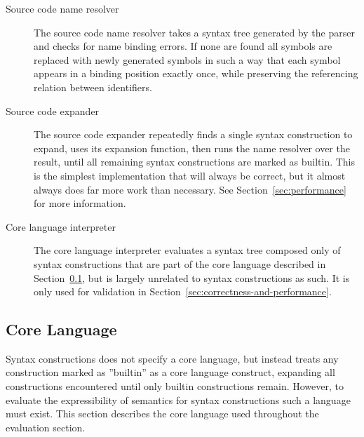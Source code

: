 \documentclass{kththesis}
\begin{document}
\begin{description}
  \item[Source code name resolver] The source code name resolver takes a syntax tree generated by the parser and checks for name binding errors. If none are found all symbols are replaced with newly generated symbols in such a way that each symbol appears in a binding position exactly once, while preserving the referencing relation between identifiers.

  \item[Source code expander] The source code expander repeatedly finds a single syntax construction to expand, uses its expansion function, then runs the name resolver over the result, until all remaining syntax constructions are marked as builtin. This is the simplest implementation that will always be correct, but it almost always does far more work than necessary. See Section~\ref{sec:performance} for more information.

  \item[Core language interpreter] The core language interpreter evaluates a syntax tree composed only of syntax constructions that are part of the core language described in Section~\ref{sec:core-language}, but is largely unrelated to syntax constructions as such. It is only used for validation in Section~\ref{sec:correctness-and-performance}.
\end{description}

\subsection{Core Language} \label{sec:core-language}

Syntax constructions does not specify a core language, but instead treats any construction marked as ''builtin'' as a core language construct, expanding all constructions encountered until only builtin constructions remain. However, to evaluate the expressibility of semantics for syntax constructions such a language must exist. This section describes the core language used throughout the evaluation section.
\end{document}
